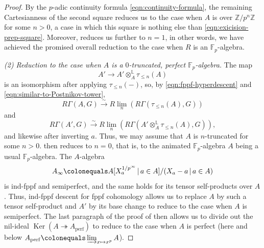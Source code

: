 \documentclass[11pt, reqno]{amsart}
\newcommand{\bF}{\mathbb{F}}
\newcommand{\bL}{\mathbb{L}}
\newcommand{\bZ}{\mathbb{Z}}
\DeclareMathOperator{\Ker}{Ker}		%
\newcommand{\ce}{\colonequals}
\newcommand{\isomto}{\overset{\sim}{\longrightarrow}}
\providecommand{\p}[1]{\left(#1\right)}
\newcommand{\perf}{\mathrm{perf}}			%
\newcommand{\ra}{\rightarrow}
\newcommand{\surjects}{\twoheadrightarrow}
\newcommand{\tensor}{\otimes} 			%
\newcommand{\tst}{\textstyle}
\numberwithin{equation}{numberingbase}
\theoremstyle{thms}
\theoremstyle{claims}
\theoremstyle{defs}
\theoremstyle{thms}
\theoremstyle{defs}
\theoremstyle{subsection-tweak}
\theoremstyle{subsection-tweak}
\begin{document}
\begin{proof}
By the $p$-adic continuity formula \eqref{eqn:continuity-formula}, the remaining Cartesianness of the second square reduces us to the case when $A$ is over $\bZ/p^n\bZ$ for some $n > 0$, a case in which this square is nothing else than \eqref{eqn:exicision-prep-square}. Moreover,   reduces us further to $n = 1$, in other words, we have achieved the promised overall reduction to the case when $R$ is an $\bF_p$-algebra.


\emph{(2) Reduction to the case when $A$ is a $0$-truncated, perfect $\bF_p$-algebra.}  
The map 
\[
A' \ra A' \tensor^\bL_A \tau_{\le n}(A)
\]
is an isomorphism after applying $\tau_{\le n}(-)$, so, by \eqref{eqn:fppf-hyperdescent} and \eqref{eqn:similar-to-Postnikov-tower}, 
\[
\tst R\Gamma(A, G) \isomto R\lim_n\p{R\Gamma(\tau_{\le n}(A), G)}
\]
and 
\[
R\Gamma(A', G) \isomto R\lim_n\p{R\Gamma(A' \tensor_A^\bL \tau_{\le n}(A), G)}\!,
\]
and likewise after inverting $a$. Thus, we may assume that $A$ is $n$-truncated for some $n > 0$.  then reduces to $n = 0$, that is, to the animated $\bF_p$-algebra $A$ being a usual $\bF_p$-algebra. The $A$-algebra 
\[
\tst A_\infty \ce A[X_a^{1/p^\infty}\, \vert\, a \in A]/(X_a - a\, \vert\, a \in A)
\]
is ind-fppf and semiperfect, and the same holds for its tensor self-products over $A$. Thus, ind-fppf descent for fppf cohomology allows us to replace $A$ by such a tensor self-product and $A'$ by its base change to reduce to the case when $A$ is semiperfect. The last paragraph of the proof of  then allows us to divide out the nil-ideal $\Ker(A\surjects A_\perf)$ to reduce to the case when $A$ is perfect (here and below $A_\perf \ce \varinjlim_{x \mapsto x^p} A$). 


\end{proof}
\end{document}
